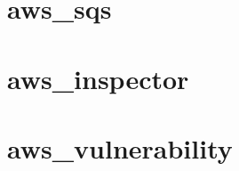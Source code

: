 \documentclass[twoside,12pt]{report}
\begin{document}
    
    
    
    
    
    
    
    \appendix
    \chapter{aws\_sqs}
    \label{app:sqs}
    
    
    \chapter{aws\_inspector}
    \label{app:inspector}
    

    \chapter{aws\_vulnerability}
    \label{app:aws_vulnerability}
    
    
    
    \beforebibliography
    
    
    
    
    \closingpage

    \shipout\null
    
    
\end{document}
